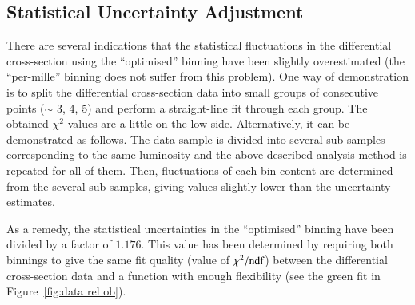 
\subsection{Statistical Uncertainty Adjustment}
\label{sec:stat unc adj}

There are several indications that the statistical fluctuations in the differential cross-section using the ``optimised'' binning have been slightly overestimated (the ``per-mille'' binning does not suffer from this problem). One way of demonstration is to split the differential cross-section data into small groups of consecutive points ($\sim$ 3, 4, 5) and perform a straight-line fit through each group. The obtained $\chi^2$ values are a little on the low side. Alternatively, it can be demonstrated as follows. The data sample is divided into several sub-samples corresponding to the same luminosity and the above-described analysis method is repeated for all of them. Then, fluctuations of each bin content are determined from the several sub-samples, giving values slightly lower than the uncertainty estimates.

As a remedy, the statistical uncertainties in the ``optimised'' binning have been divided by a factor of $1.176$. This value has been determined by requiring both binnings to give the same fit quality (value of $\chi^2/\hbox{ndf}$) between the differential cross-section data and a function with enough flexibility (see the green fit in Figure~\ref{fig:data rel ob}).
